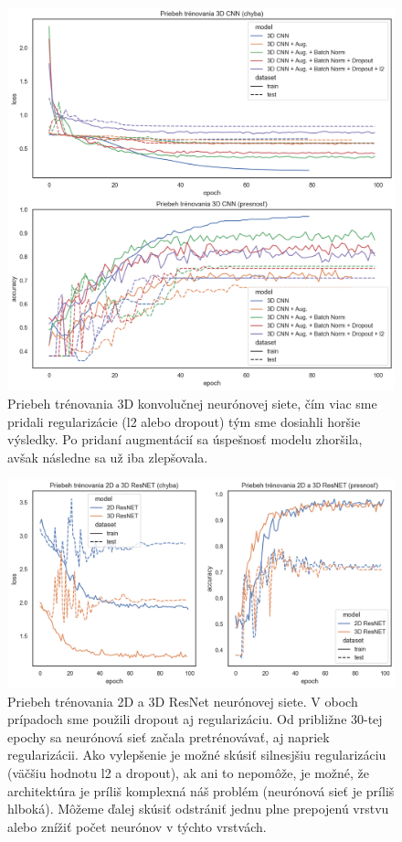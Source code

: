 \begin{figure}[h!]
    \centering
    \includegraphics[width=14cm]{assets/images/3d_cnn_training.png}
    \caption{Priebeh trénovania 3D konvolučnej neurónovej siete, čím viac sme pridali regularizácie (l2 alebo dropout) tým sme dosiahli horšie výsledky. Po pridaní augmentácií sa úspešnosť modelu zhoršila, avšak následne sa už iba zlepšovala.}
    \label{fig:3d_cnn_training}
\end{figure}

\begin{figure}[h!]
    \centering
    \includegraphics[width=14cm]{assets/images/2d_3d_res_net_training.png}
    \caption{Priebeh trénovania 2D a 3D ResNet neurónovej siete. V oboch prípadoch sme použili dropout aj regularizáciu. Od približne 30-tej epochy sa neurónová sieť začala pretrénovávať, aj napriek regularizácii. Ako vylepšenie je možné skúsiť silnesjšiu regularizáciu (väčšiu hodnotu l2 a dropout), ak ani to nepomôže, je možné, že architektúra je príliš komplexná náš problém (neurónová sieť je príliš hlboká). Môžeme ďalej skúsiť odstrániť jednu plne prepojenú vrstvu alebo znížiť počet neurónov v týchto vrstvách.}
    \label{fig:2d_3d_res_net_training}
\end{figure}

